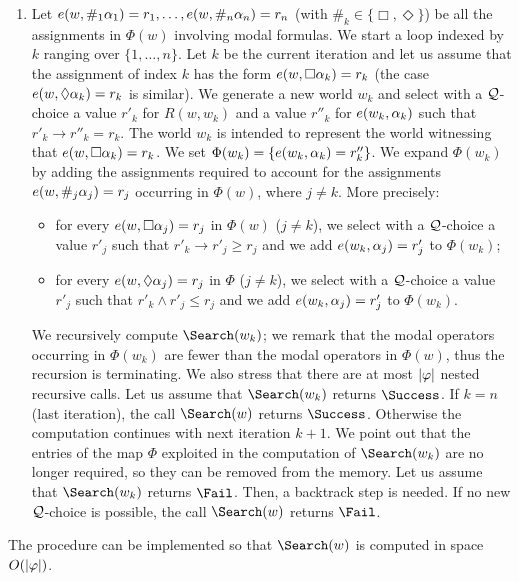 \begin{enumerate}[label*=(Step~\arabic*)]
\begin{itemize}
  \item Otherwise, $\Phi(w)$ contains at least  a
    modal formula and the computation continues with~\ref{step:2}.
  \end{itemize}  

\item\label{step:2} Let $e(w,\#_1\alpha_1)=r_1,\dots,e(w,\#_n\alpha_n)=r_n$
  (with $\#_k\in\{\Box,\Diamond\}$) be all the assignments in $\Phi(w)$
  involving modal formulas.  We start a loop indexed by $k$ ranging
  over $\{1,\dots,n\}$.  Let $k$ be the current iteration and let us
  assume that the assignment of index $k$ has the form
  $e(w,\Box\alpha_k)=r_k$ (the case $e(w,\lozenge\alpha_k)=r_k$ is similar).  We
  generate a new world $w_k$ and select with a $\mathcal{Q}$-choice a value
  $r'_k$ for $R(w,w_k)$ and a value $r''_k$ for $e(w_k,\alpha_k)$ such
  that $r'_k\to r''_k = r_k$. The world $w_k$ is intended to represent
  the world witnessing that $e(w,\Box\alpha_k)=r_k$. We set
  $\Phi(w_k)=\{e(w_k,\alpha_k)=r''_k\}$.  We expand $\Phi(w_k)$ by adding
  the assignments required to account for the assignments
  $e(w,\#_j\alpha_j)=r_j$ occurring in $\Phi(w)$, where $j\neq k$. More
  precisely:
  \begin{itemize}
  \item for every $e(w,\Box \alpha_j)=r_j$ in $\Phi(w)$ ($j\neq k$), we
    select with a $\mathcal{Q}$-choice a value $r'_j$ such that $r'_k \to
    r'_j \geq r_j$ and we add $e(w_k,\alpha_j)=r'_j$ to $\Phi(w_k)$;
    

  \item for every $e(w,\lozenge \alpha_j)=r_j$ in $\Phi$ ($j\neq k$), we
    select with a $\mathcal{Q}$-choice a value $r'_j$ such that $r'_k \land
    r'_j \leq r_j$ and we add $e(w_k,\alpha_j)=r'_j$ to $\Phi(w_k)$.
  \end{itemize}
  We recursively compute $\Search(w_k)$; we remark that the modal
  operators occurring in $\Phi(w_k)$ are fewer than the modal
  operators in $\Phi(w)$, thus the recursion is terminating. We also
  stress that there are at most $|\varphi|$ nested recursive calls.  Let
  us assume that $\Search(w_k)$ returns $\Success$.  If $k=n$ (last
  iteration), the call $\Search(w)$ returns $\Success$.  Otherwise the
  computation continues with next iteration $k+1$.  We point out that
  the entries of the map $\Phi$ exploited in the computation of
  $\Search(w_k)$ are no longer required, so they can be removed from
  the  memory.  Let us assume that $\Search(w_k)$ returns $\Fail$.
  Then, a backtrack step is needed.  If no new $\mathcal{Q}$-choice is
  possible, the call $\Search(w)$ returns $\Fail$.
\end{enumerate}
The procedure  can be implemented so that  $\Search(w)$ is computed in space $O(|\varphi|)$.

